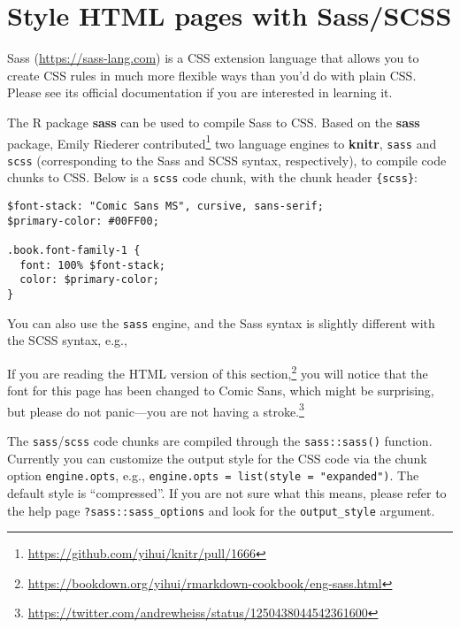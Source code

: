\documentclass[
  11pt,
]{krantz}
\newenvironment{Shaded}{\begin{snugshade}}{\end{snugshade}}
\newcommand{\BaseNTok}[1]{\textcolor[rgb]{0.06,0.06,0.06}{#1}}
\renewcommand{\href}[2]{#2\footnote{\url{#1}}}
\begin{document}
\hypertarget{eng-sass}{%
\section{Style HTML pages with Sass/SCSS}\label{eng-sass}}

Sass (\url{https://sass-lang.com}) is a CSS extension language that allows you to create CSS rules in much more flexible ways than you'd do with plain CSS. Please see its official documentation if you are interested in learning it.

The R package \textbf{sass} \citep{R-sass} can be used to compile Sass to CSS. Based on the \textbf{sass} package, \href{https://github.com/yihui/knitr/pull/1666}{Emily Riederer contributed} two language engines to \textbf{knitr}, \texttt{sass} and \texttt{scss} (corresponding to the Sass and SCSS syntax, respectively), to compile code chunks to CSS. Below is a \texttt{scss} code chunk, with the chunk header \texttt{\textasciigrave{}\textasciigrave{}\textasciigrave{}\{scss\}}:

\begin{verbatim}
$font-stack: "Comic Sans MS", cursive, sans-serif;
$primary-color: #00FF00;

.book.font-family-1 {
  font: 100% $font-stack;
  color: $primary-color;
}
\end{verbatim}

You can also use the \texttt{sass} engine, and the Sass syntax is slightly different with the SCSS syntax, e.g.,

\begin{Shaded}
\end{Shaded}

If you are reading \href{https://bookdown.org/yihui/rmarkdown-cookbook/eng-sass.html}{the HTML version of this section,} you will notice that the font for this page has been changed to Comic Sans, which might be surprising, but please do not panic---\href{https://twitter.com/andrewheiss/status/1250438044542361600}{you are not having a stroke.}

The \texttt{sass}/\texttt{scss} code chunks are compiled through the \texttt{sass::sass()} function. Currently you can customize the output style for the CSS code via the chunk option \texttt{engine.opts}, e.g., \texttt{engine.opts\ =\ list(style\ =\ "expanded")}. The default style is ``compressed''. If you are not sure what this means, please refer to the help page \texttt{?sass::sass\_options} and look for the \texttt{output\_style} argument.
\end{document}
